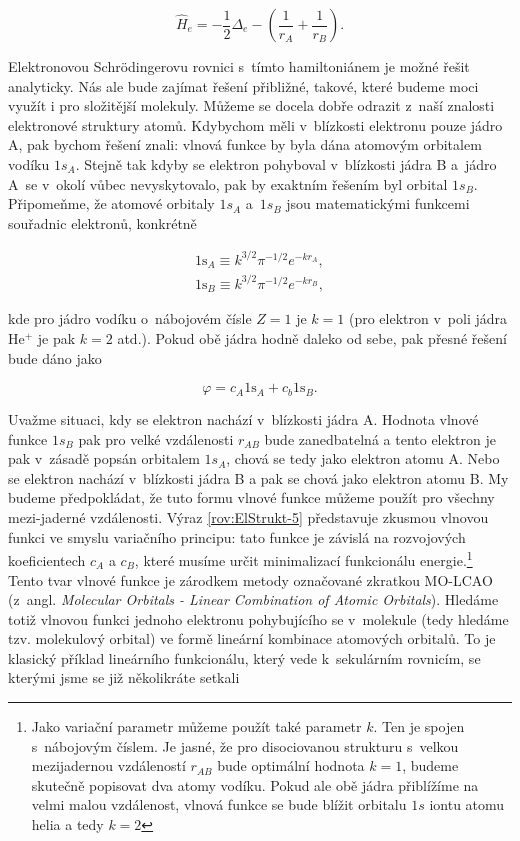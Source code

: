 \begin{equation}
\hat{H}_e = -\frac{1}{2}\Delta_e - \left( \frac{1}{r_A} + \frac{1}{r_B} \right).
\label{rov:ElStrukt-3}
\end{equation}

Elektronovou Schr\"odingerovu rovnici s~tímto hamiltoniánem je možné řešit analyticky. Nás ale bude zajímat řešení přibližné, takové, které budeme moci využít i pro složitější molekuly. Můžeme se docela dobře odrazit z~naší znalosti elektronové struktury atomů. Kdybychom měli v~blízkosti elektronu pouze jádro A, pak bychom řešení znali: vlnová funkce by byla dána atomovým orbitalem vodíku $1s_A$. Stejně tak kdyby se elektron pohyboval v~blízkosti jádra B a~jádro A~se v~okolí vůbec nevyskytovalo, pak by exaktním řešením byl orbital $1s_B$. Připomeňme, že atomové orbitaly $1s_A$ a~$1s_B$ jsou matematickými funkcemi souřadnic elektronů, konkrétně

\begin{eqnarray}
1\mathrm{s}_A \equiv k^{3/2} \pi^{-1/2} e^{-k r_A}, \nonumber \\
1\mathrm{s}_B \equiv k^{3/2} \pi^{-1/2} e^{-k r_B}, 
\label{rov:ElStrukt-4}
\end{eqnarray}

\noindent kde pro jádro vodíku o~nábojovém čísle $Z=1$ je $k=1$ (pro elektron v~poli jádra He$^+$ je pak $k=2$ atd.). Pokud obě jádra hodně daleko od sebe, pak přesné řešení bude dáno jako

\begin{equation}
\varphi = c_A 1 \mathrm{s}_A + c_b 1\mathrm{s}_B.
\label{rov:ElStrukt-5}
\end{equation}

Uvažme situaci, kdy se elektron nachází v~blízkosti jádra A. Hodnota vlnové funkce $1s_B$ pak pro velké vzdálenosti $r_{AB}$ bude zanedbatelná a tento elektron je pak v~zásadě popsán orbitalem $1s_A$, chová se tedy jako elektron atomu A. Nebo se elektron nachází v~blízkosti jádra B a pak se chová jako elektron atomu B. My budeme předpokládat, že tuto formu vlnové funkce můžeme použít pro všechny mezi-jaderné vzdálenosti. Výraz \eqref{rov:ElStrukt-5} představuje zkusmou vlnovou funkci ve smyslu variačního principu: tato funkce je závislá na rozvojových koeficientech $c_A$ a $c_B$, které musíme určit minimalizací funkcionálu energie.\footnote{Jako variační parametr můžeme použít také parametr $k$. Ten je spojen s~nábojovým číslem. Je jasné, že pro disociovanou strukturu s~velkou mezijadernou vzdáleností $r_{AB}$ bude optimální hodnota $k=1$, budeme skutečně popisovat dva atomy vodíku. Pokud ale obě jádra přiblížíme na velmi malou vzdálenost, vlnová funkce se bude blížit orbitalu $1s$ iontu atomu helia a tedy $k=2$} Tento tvar vlnové funkce je zárodkem metody označované zkratkou MO-LCAO (z~angl. \textit{Molecular Orbitals - Linear Combination of Atomic Orbitals}). Hledáme totiž vlnovou funkci jednoho elektronu pohybujícího se v~molekule (tedy hledáme tzv. molekulový orbital) ve formě lineární kombinace atomových orbitalů. To je klasický příklad lineárního funkcionálu, který vede k~sekulárním rovnicím, se kterými jsme se již několikráte setkali

